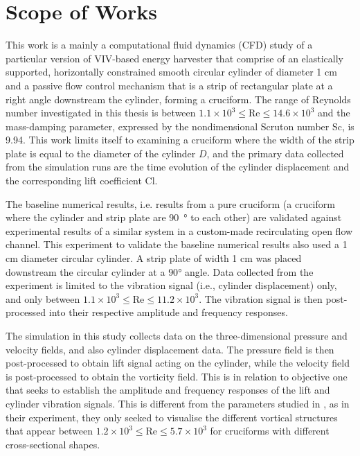 \documentclass[oneside]{utmthesis}
\begin{document}
\section{Scope of Works} \label{sec:scopeWork}
This work is a mainly a computational fluid dynamics (CFD) study of a particular version of VIV-based energy harvester that comprise of an elastically supported, horizontally constrained smooth circular cylinder of diameter 1 cm and a passive flow control mechanism that is a strip of rectangular plate at a right angle downstream the cylinder, forming a cruciform. The range of Reynolds number investigated in this thesis is between $1.1 \times 10^{3} \leq \text{Re} \leq 14.6 \times 10^{3}$ and the mass-damping parameter, expressed by the nondimensional Scruton number Sc, is 9.94. This work limits itself to examining a cruciform where the width of the strip plate is equal to the diameter of the cylinder $D$, and the primary data collected from the simulation runs are the time evolution of the cylinder displacement and the corresponding lift coefficient Cl.

The baseline numerical results, i.e. results from a pure cruciform (a cruciform where the cylinder and strip plate are \SI{90}{\degree} to each other) are validated against experimental results of a similar system in a custom-made recirculating open flow channel. This experiment to validate the baseline numerical results also used a 1 cm diameter circular cylinder. A strip plate of width 1 cm was placed downstream the circular cylinder at a $90 \si{\degree}$ angle. Data collected from the experiment is limited to the vibration signal (i.e., cylinder displacement) only, and only between $1.1 \times 10^{3} \leq \text{Re} \leq 11.2 \times 10^{3}$. The vibration signal is then post-processed into their respective amplitude and frequency responses.

The simulation in this study collects data on the three-dimensional pressure and velocity fields, and also cylinder displacement data. The pressure field is then post-processed to obtain lift signal acting on the cylinder, while the velocity field is post-processed to obtain the vorticity field. This is in relation to objective one that seeks to establish the amplitude and frequency responses of the lift and cylinder vibration signals. This is different from the parameters studied in \citet{Koide2017}, as in their experiment, they only seeked to visualise the different vortical structures that appear between $1.2 \times 10^{3} \leq \text{Re} \leq 5.7 \times 10^{3}$ for cruciforms with different cross-sectional shapes.
\end{document}
